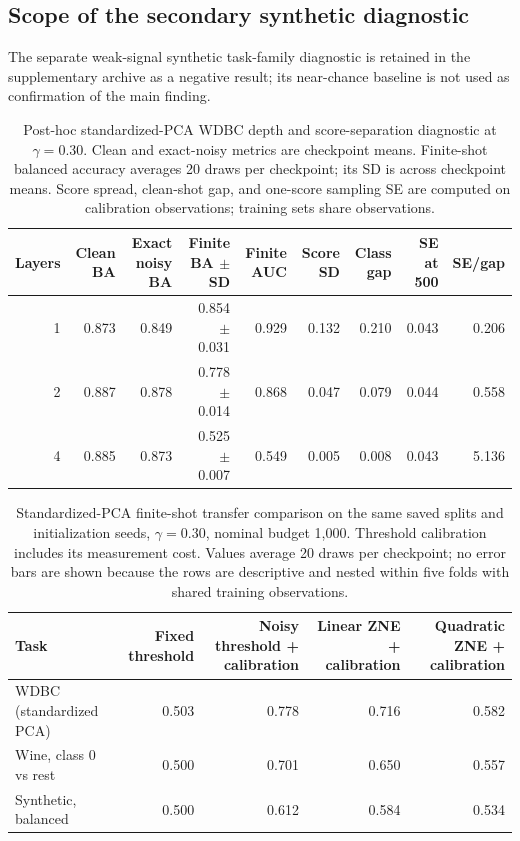 \documentclass[conference]{IEEEtran}
\begin{document}
\subsection{Scope of the secondary synthetic diagnostic}
The separate weak-signal synthetic task-family diagnostic is retained in the supplementary archive as a negative result; its near-chance baseline is not used as confirmation of the main finding.

\begin{table}[t]\centering\scriptsize
\caption{Post-hoc standardized-PCA WDBC depth and score-separation diagnostic at $\gamma=0.30$. Clean and exact-noisy metrics are checkpoint means. Finite-shot balanced accuracy averages 20 draws per checkpoint; its SD is across checkpoint means. Score spread, clean-shot gap, and one-score sampling SE are computed on calibration observations; training sets share observations.}
\label{tab:primary-depth}
\begin{tabular}{@{}r r r r r r r r r@{}}\toprule
Layers & Clean BA & Exact noisy BA & Finite BA $\pm$ SD & Finite AUC & Score SD & Class gap & SE at 500 & SE/gap \\ \midrule
1 & 0.873 & 0.849 & 0.854 $\pm$ 0.031 & 0.929 & 0.132 & 0.210 & 0.043 & 0.206 \\
2 & 0.887 & 0.878 & 0.778 $\pm$ 0.014 & 0.868 & 0.047 & 0.079 & 0.044 & 0.558 \\
4 & 0.885 & 0.873 & 0.525 $\pm$ 0.007 & 0.549 & 0.005 & 0.008 & 0.043 & 5.136 \\
\bottomrule\end{tabular}\end{table}

\begin{table}[t]\centering\small
\caption{Standardized-PCA finite-shot transfer comparison on the same saved splits and initialization seeds, $\gamma=0.30$, nominal budget 1,000. Threshold calibration includes its measurement cost. Values average 20 draws per checkpoint; no error bars are shown because the rows are descriptive and nested within five folds with shared training observations.}
\label{tab:primary-transfer}
\begin{tabular}{@{}l r r r r@{}}\toprule
Task & Fixed threshold & Noisy threshold + calibration & Linear ZNE + calibration & Quadratic ZNE + calibration \\ \midrule
WDBC (standardized PCA) & 0.503 & 0.778 & 0.716 & 0.582 \\
Wine, class 0 vs rest & 0.500 & 0.701 & 0.650 & 0.557 \\
Synthetic, balanced & 0.500 & 0.612 & 0.584 & 0.534 \\
\bottomrule\end{tabular}\end{table}
\end{document}
